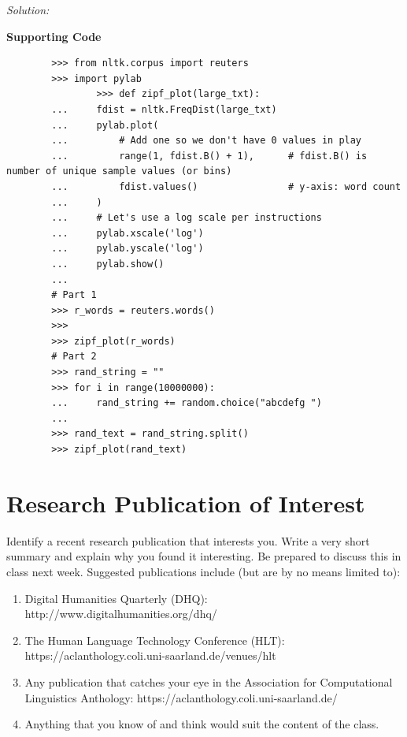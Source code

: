 \documentclass[11pt]{article}
\newenvironment{solution}{
	\vspace{10px}\noindent\emph{Solution:}
}{
	\vspace{10px}
}
\begin{document}
\begin{solution}
	\textbf{Supporting Code}
	\begin{lstlisting}
		>>> from nltk.corpus import reuters
		>>> import pylab
				>>> def zipf_plot(large_txt):
		...     fdist = nltk.FreqDist(large_txt)
		...     pylab.plot(
		...         # Add one so we don't have 0 values in play
		...         range(1, fdist.B() + 1),      # fdist.B() is number of unique sample values (or bins)
		...         fdist.values()                # y-axis: word count
		...     )
		...     # Let's use a log scale per instructions
		...     pylab.xscale('log')
		...     pylab.yscale('log')
		...     pylab.show()
		...
		# Part 1
		>>> r_words = reuters.words()
		>>>
		>>> zipf_plot(r_words)
		# Part 2
		>>> rand_string = ""
		>>> for i in range(10000000):
		...     rand_string += random.choice("abcdefg ")
		...
		>>> rand_text = rand_string.split()
		>>> zipf_plot(rand_text)
	\end{lstlisting}
	
\end{solution}  


\section*{Research Publication of Interest} Identify a recent research publication that interests you. Write a very short summary and explain why you found it interesting. Be prepared to discuss this in class next week. Suggested publications include (but are by no means limited to): 

\begin{enumerate}
	\item Digital Humanities Quarterly (DHQ): http://www.digitalhumanities.org/dhq/ 
	
	\item The Human Language Technology Conference (HLT): https://aclanthology.coli.uni-saarland.de/venues/hlt
	
	\item Any publication that catches your eye in the Association for Computational Linguistics Anthology: https://aclanthology.coli.uni-saarland.de/ 
	
	\item Anything that you know of and think would suit the content of the class.
	
	
\end{enumerate}
\end{document}

